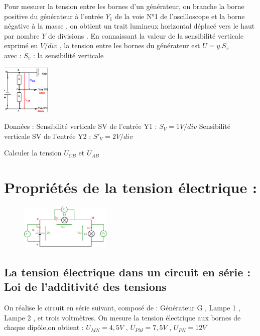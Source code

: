 \documentclass[12pt]{article}
\begin{document}
Pour mesurer la tension entre les bornes d’un générateur, on branche la borne positive du générateur à
l’entrée $Y_1$ de la voie N°1 de l’oscilloscope et la borne négative à la masse , on obtient un trait lumineux
horizontal déplacé vers le haut par nombre $Y$ de divisions . En connaissant la valeur de la sensibilité
verticale exprimé en $V / div$ , la tension entre les bornes du générateur est $U = y . S_v$ 
\\avec :
$S_v$ : la sensibilité verticale


\begin{center}
  \includegraphics[width=0.175\textwidth]{./img/img_circuit_03.png}
\end{center}
Données :
Sensibilité verticale SV de l’entrée Y1 : $S_V = 1 V / div$
Sensibilité verticale SV de l’entrée Y2 : $S'_V = 2 V / div$

Calculer la tension $U_{CB}$ et $ U_{AB}$

\section{Propriétés de la tension électrique : }

\begin{figure}

    \vspace{-1.5cm}
\includegraphics[width=0.39\textwidth]{./img/img_circuit_serie_04.png}
\end{figure}


\subsection{La tension électrique dans un circuit en série : Loi de l’additivité des tensions}
On réalise le circuit en série suivant, composé de : Générateur G , Lampe 1 , Lampe 2 , et trois voltmètres.
On mesure la tension électrique aux bornes de chaque dipôle,on obtient :
$U_{MN} = 4,5 V$ , $U_{PM} = 7,5 V$ , $U_{PN} = 12 V$
\end{document}
